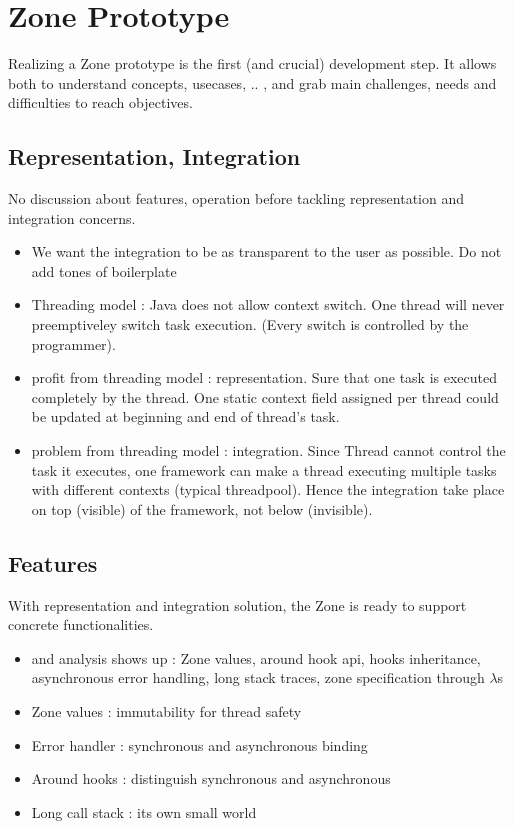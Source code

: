 
\chapter{Zone Prototype}

Realizing a Zone prototype is the first (and crucial) development step. It allows both to understand concepts, usecases, .. , and grab main challenges, needs and difficulties to reach objectives.

\section{Representation, Integration}

No discussion about features, operation before tackling representation and integration concerns.

\begin{itemize}
\item We want the integration to be as transparent to the user as possible. Do not add tones of boilerplate
\item Threading model : Java does not allow context switch. One thread will never preemptiveley switch task execution. (Every switch is controlled by the programmer).
\item profit from threading model : representation. Sure that one task is executed completely by the thread. One static context field assigned per thread could be updated at beginning and end of thread's task.
\item problem from threading model : integration. Since Thread cannot control the task it executes, one framework can make a thread executing multiple tasks with different contexts (typical threadpool). Hence the integration take place on top (visible) of the framework, not below (invisible).
\end{itemize}

\section{Features}

With representation and integration solution, the Zone is ready to support concrete functionalities.

\begin{itemize}
\item \zonejs and \zonedrt analysis shows up : Zone values, around hook api, hooks inheritance, asynchronous error handling, long stack traces, zone specification through $\lambda$s
\item Zone values : immutability for thread safety
\item Error handler : synchronous and asynchronous binding
\item Around hooks : distinguish synchronous and asynchronous
\item Long call stack : its own small world
\end{itemize}

